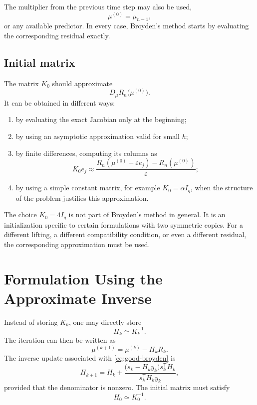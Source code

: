 \documentclass[11pt,a4paper]{article}
\begin{document}
The multiplier from the previous time step may also be used,
\[
    \mu^{(0)}=\mu_{n-1},
\]
or any available predictor. In every case, Broyden's method starts by
evaluating the corresponding residual exactly.

\subsection{Initial matrix}

The matrix $K_0$ should approximate
\[
    D_\mu R_n\bigl(\mu^{(0)}\bigr).
\]
It can be obtained in different ways:

\begin{enumerate}
    \item by evaluating the exact Jacobian only at the beginning;

    \item by using an asymptotic approximation valid for small $h$;

    \item by finite differences, computing its columns as
    \begin{equation}
        K_0e_j
        \approx
        \frac{R_n(\mu^{(0)}+\varepsilon e_j)
              -R_n(\mu^{(0)})}{\varepsilon};
        \label{eq:finite-difference-initialization}
    \end{equation}

    \item by using a simple constant matrix, for example
    $K_0=\alpha I_q$, when the structure of the problem justifies this
    approximation.
\end{enumerate}

The choice $K_0=4I_q$ is not part of Broyden's method in general. It is an
initialization specific to certain formulations with two symmetric copies.
For a different lifting, a different compatibility condition, or even a
different residual, the corresponding approximation must be used.

\section{Formulation Using the Approximate Inverse}

Instead of storing $K_k$, one may directly store
\[
    H_k\simeq K_k^{-1}.
\]
The iteration can then be written as
\begin{equation}
    \mu^{(k+1)}=\mu^{(k)}-H_kR_k.
    \label{eq:inverse-step}
\end{equation}
The inverse update associated with \eqref{eq:good-broyden} is
\begin{equation}
    \boxed{
    H_{k+1}
    =H_k+
    \frac{\bigl(s_k-H_ky_k\bigr)s_k^{\mathsf T}H_k}
         {s_k^{\mathsf T}H_ky_k},}
    \label{eq:inverse-broyden}
\end{equation}
provided that the denominator is nonzero. The initial matrix must satisfy
\[
    H_0\simeq K_0^{-1}.
\]
\end{document}

